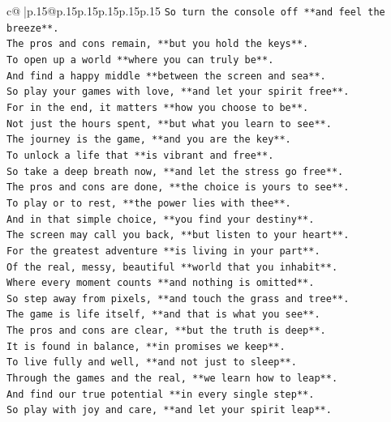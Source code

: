 \documentclass{article}
\begin{document}
{\begin{supertabular}{c@{$\;$}|p{.15\linewidth}@{}p{.15\linewidth}p{.15\linewidth}p{.15\linewidth}p{.15\linewidth}p{.15\linewidth}}
{{{\texttt{So turn the console off **and feel the breeze**.} \\
\texttt{The pros and cons remain, **but you hold the keys**.} \\
\texttt{To open up a world **where you can truly be**.} \\
\texttt{And find a happy middle **between the screen and sea**.} \\
\texttt{So play your games with love, **and let your spirit free**.} \\
\texttt{For in the end, it matters **how you choose to be**.} \\
\texttt{Not just the hours spent, **but what you learn to see**.} \\
\texttt{The journey is the game, **and you are the key**.} \\
\texttt{To unlock a life that **is vibrant and free**.} \\
\texttt{So take a deep breath now, **and let the stress go free**.} \\
\texttt{The pros and cons are done, **the choice is yours to see**.} \\
\texttt{To play or to rest, **the power lies with thee**.} \\
\texttt{And in that simple choice, **you find your destiny**.} \\
\texttt{The screen may call you back, **but listen to your heart**.} \\
\texttt{For the greatest adventure **is living in your part**.} \\
\texttt{Of the real, messy, beautiful **world that you inhabit**.} \\
\texttt{Where every moment counts **and nothing is omitted**.} \\
\texttt{So step away from pixels, **and touch the grass and tree**.} \\
\texttt{The game is life itself, **and that is what you see**.} \\
\texttt{The pros and cons are clear, **but the truth is deep**.} \\
\texttt{It is found in balance, **in promises we keep**.} \\
\texttt{To live fully and well, **and not just to sleep**.} \\
\texttt{Through the games and the real, **we learn how to leap**.} \\
\texttt{And find our true potential **in every single step**.} \\
\texttt{So play with joy and care, **and let your spirit leap**.} \\
}}}
\end{supertabular}}
\end{document}
